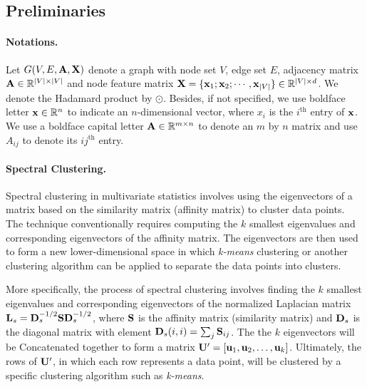 
\subsection{Preliminaries}
\paragraph{Notations.}
Let $G(V,E,\A,\X)$ denote a graph with node set $V$, edge set $E$, adjacency matrix $\A \in \R^{|V|\times |V|}$ and node feature matrix $\X = \{\x_1;\x_2; \cdots,\x_{|V|}\} \in\R^{|V|\times d}$. We denote the Hadamard product by $\odot$. Besides, if not specified, we use boldface letter $\x\in \R^n$
 to indicate an $n$-dimensional vector, where $x_i$ is
the $i^\text{th}$ entry of $\x$. We use a boldface capital letter
$\mbf A\in\R^{m\times n}$ to denote an $m$ by $n$ matrix and use $A_{ij}$ to denote its ${ij}^\text{th}$ entry. 
\paragraph{Spectral Clustering.}
Spectral clustering in multivariate statistics involves using the eigenvectors of a matrix based on the similarity matrix (affinity matrix) to cluster data points. The technique conventionally requires computing the $k$ smallest eigenvalues and corresponding eigenvectors of the affinity matrix.
The eigenvectors are then used to form a new lower-dimensional space in which \textit{k-means} clustering or another clustering algorithm can be applied to separate the data points into clusters.

More specifically, the process of spectral clustering involves finding the $k$ smallest eigenvalues and corresponding eigenvectors of the normalized Laplacian matrix $\L_s = \D_s^{-1/2} \mbf S \D_s^{-1/2}$, where $\S$ is the affinity matrix (similarity matrix) and $\D_s$ is the diagonal matrix with element $\D_s(i,i)=\sum_j \S_{ij}$.
The the $k$ eigenvectors will be Concatenated together to form a matrix $\mbf U' = [\mathbf{u}_1, \mathbf{u}_2, \ldots, \mathbf{u}_k]$. Ultimately, the rows of $\mbf U'$, in which each row represents a data point, will be clustered by a specific clustering algorithm such as \textit{k-means}.

\iffalse
The reason that spectral clustering uses the eigenvectors corresponding to the smallest eigenvalues is due to the properties of the affinity matrix used in the process. The affinity matrix used in spectral clustering is generally sparse and contains noise, which can result in the smallest eigenvalues being more informative than the larger ones. In spectral clustering, these small eigenvalues and corresponding eigenvectors provide the most discriminating information for clustering.
\fi

